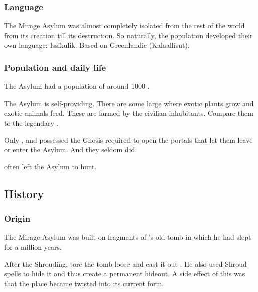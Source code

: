 \subsubsection{Language}
The Mirage Asylum was almost completely isolated from the rest of the world from its creation till its destruction. 
So naturally, the population developed their own language: 
Issikulik. 
Based on Greenlandic (Kalaallisut). 





\subsubsection{Population and daily life}
The Asylum had a population of around 1000 \scathae. 

The Asylum is self-providing. 
There are some large  where exotic plants grow and exotic animals feed. 
These are farmed by the civilian inhabitants. 
Compare them to the legendary . 

Only \Iscrafel,  and  possessed the Gnosis required to open the portals that let them leave or enter the Asylum. 
And they seldom did. 

\Iscrafel often left the Asylum to hunt. 









\subsection{History}





\subsubsection{Origin}
The Mirage Asylum was built on fragments of \Ishnaruchaefir's old tomb in which he had slept for a million years.

After the Shrouding, \Ishnaruchaefir tore the tomb loose and cast it out . 
He also used Shroud spells to hide it and thus create a permanent hideout. 
A side effect of this was that the place became twisted into its current form. 





